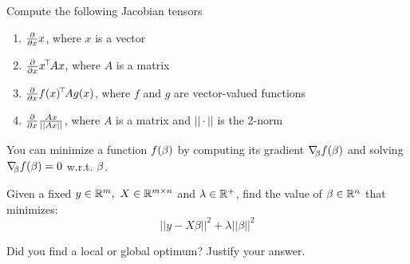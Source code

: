 
Compute the following Jacobian tensors
\begin{enumerate}
  \item $\textstyle\frac{\partial}{\partial x} x$, where $x$ is a vector
  \item $\textstyle\frac{\partial}{\partial x} x^{\!\top\!} A x$, where $A$ is a matrix
  \item $\textstyle\frac{\partial}{\partial x} f(x)^{\!\top\!} A g(x)$, where $f$ and $g$ are vector-valued functions
  \item $\textstyle\frac{\partial}{\partial x} \frac{Ax}{||Ax||} $, where $A$ is a matrix and $||\cdot||$ is the 2-norm
\end{enumerate}





You can minimize a function $f(\beta)$ by computing its gradient ${\nabla_{\!\!}}_\beta f(\beta)$ and solving ${\nabla_{\!\!}}_\beta f(\beta) = 0$ w.r.t. $\beta$.

Given a fixed $y \in {\mathbb{R}}^m,~X \in {\mathbb{R}}^{m \times n}$ and $\lambda \in {\mathbb{R}}^+$, find the value of  $\beta \in {\mathbb{R}}^n$ that minimizes:
 \begin{equation}
 ||y - X \beta ||^2 + \lambda || \beta ||^2
 \end{equation}

 Did you find a local or global optimum? Justify your answer.







